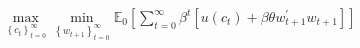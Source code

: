 \documentclass[preview]{standalone}
\begin{document}
\begin{align*}
\max_{\left\{c_t\right\}_{t=0}^{\infty}} \min_{\left\{w_{t+1}\right\}_{t=0}^{\infty}} \mathbb{E}_0 \left[\sum_{t=0}^{\infty} \beta^t \left[u(c_t)+\beta \theta w_{t+1}^{\prime}w_{t+1}\right]\right]
\end{align*}
\end{document}
